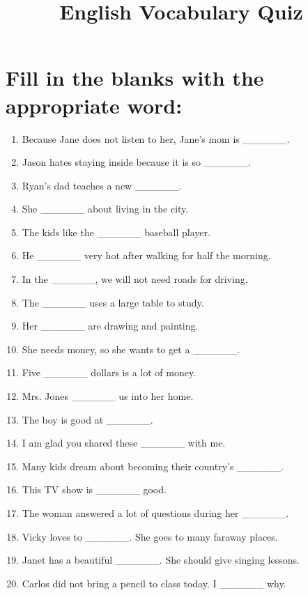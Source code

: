 \documentclass[a4paper,12pt]{article}
\title{English Vocabulary Quiz}
\date{}
\begin{document}
\maketitle

\section*{Fill in the blanks with the appropriate word:}

\begin{enumerate}[label=\arabic*.]

    \item Because Jane does not listen to her, Jane's mom is \_\_\_\_\_\_.
    \item Jason hates staying inside because it is so \_\_\_\_\_\_.
    \item Ryan's dad teaches a new \_\_\_\_\_\_.
    \item She \_\_\_\_\_\_ about living in the city.
    \item The kids like the \_\_\_\_\_\_ baseball player.
    \item He \_\_\_\_\_\_ very hot after walking for half the morning.
    \item In the \_\_\_\_\_\_, we will not need roads for driving.
    \item The \_\_\_\_\_\_ uses a large table to study.
    \item Her \_\_\_\_\_\_ are drawing and painting.
    \item She needs money, so she wants to get a \_\_\_\_\_\_.
    \item Five \_\_\_\_\_\_ dollars is a lot of money.
    \item Mrs. Jones \_\_\_\_\_\_ us into her home.
    \item The boy is good at \_\_\_\_\_\_.
    \item I am glad you shared these \_\_\_\_\_\_ with me.
    \item Many kids dream about becoming their country's \_\_\_\_\_\_.
    \item This TV show is \_\_\_\_\_\_ good.
    \item The woman answered a lot of questions during her \_\_\_\_\_\_.
    \item Vicky loves to \_\_\_\_\_\_. She goes to many faraway places.
    \item Janet has a beautiful \_\_\_\_\_\_. She should give singing lessons.
    \item Carlos did not bring a pencil to class today. I \_\_\_\_\_\_ why.

\end{enumerate}
\end{document}

